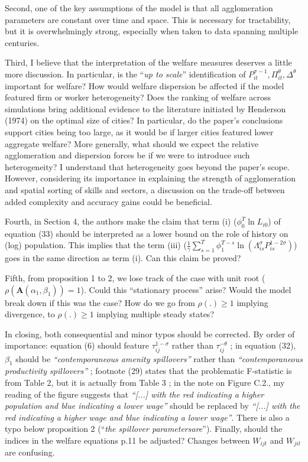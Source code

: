 \documentclass[10pt, final]{article}
\begin{document}
Second, one of the key assumptions of the model is that all agglomeration parameters are constant over time and space. This is necessary for tractability, but it is overwhelmingly strong, especially when taken to data spanning multiple centuries.

Third, I believe that the interpretation of the welfare measures deserves a little more discussion. In particular, is the ``\textit{up to scale}'' identification of $P_{it}^{\sigma-1}, \Pi_{it}^{\theta}, \Delta^{\theta}$ important for welfare? How would welfare dispersion be affected if the model featured firm or worker heterogeneity? 
Does the ranking of welfare across simulations bring additional evidence to the literature initiated by Henderson (1974) on the optimal size of cities?  In particular, do the paper's conclusions support cities being too large, as it would be if larger cities featured lower aggregate welfare?
More generally, what should we expect the relative agglomeration and dispersion forces be if we were to introduce such heterogeneity? 
I understand that heterogeneity goes beyond the paper’s scope. However, considering its importance in explaining the strength of agglomeration and spatial sorting of skills and sectors, a discussion on the trade-off between added complexity and accuracy gains could be beneficial. 

Fourth, in Section 4, the authors make the claim that term (i) ($\phi_0^T \ln L_{i0}$) of equation (33) should be interpreted as a lower bound on the role of history on (log) population. This implies that the term (iii) ($\frac{1}{\gamma}\sum_{s=1}^T \phi_1^{T-s} \ln(\Lambda_{is}^\sigma P_{is}^{1-2\sigma})$) goes in the same direction as term (i). Can this claim be proved?

Fifth, from proposition 1 to 2, we lose track of the case with unit root ($\rho(\mathbf{A}(\alpha_1, \beta_1)) = 1$). Could this ``stationary process'' arise? Would the model break down if this was the case? How do we go from $\rho(.) \geq 1$ implying divergence, to $\rho(.) \geq 1$ implying multiple steady states?

In closing, both consequential and minor typos should be corrected. By order of importance: equation (6) should feature $\tau_{ij}^{1 - \sigma}$ rather than $\tau_{ij}^{-\theta}$ ; in equation (32), $\beta_1$ should be \textit{``contemporaneous amenity spillovers''} rather than \textit{``contemporaneous productivity spillovers''} ; footnote (29) states that the problematic F-statistic is from Table 2, but it is actually from Table 3 ; in the note on Figure C.2., my reading of the figure suggests that \textit{``[...] with the red indicating a higher population and blue indicating a lower wage''} should be replaced by \textit{``[...] with the red indicating a higher wage and blue indicating a lower wage''}. There is also a typo below proposition 2 (``\textit{the spillover parametersare}'').
Finally, should the indices in the welfare equations p.11 be adjusted? Changes between $W_{ijt}$ and $W_{jit}$ are confusing. 
\end{document}
